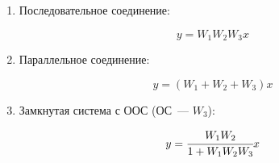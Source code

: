 \begin{enumerate}
    \item Последовательное соединение:
    \begin{figure}[h!]
        \begin{minipage}[h]{0.5\linewidth}
        \end{minipage}
        \begin{minipage}[h]{0.5\linewidth}
            \begin{equation}
                y = W_1 W_2 W_3 x
            \end{equation}
        \end{minipage}
    \end{figure}
    
    \item Параллельное соединение:
    \begin{figure}[h!]
        \begin{minipage}[h]{0.5\linewidth}
        \end{minipage}
        \begin{minipage}[h]{0.5\linewidth}
            \begin{equation}
                y = (W_1 + W_2 + W_3) x
            \end{equation}
    \end{minipage}
    \end{figure}
    
    \item Замкнутая система с ООС (ОС~--- $W_3$):
    \begin{figure}[h!]
        \begin{minipage}[h]{0.5\linewidth}
        \end{minipage}
        \begin{minipage}[h]{0.5\linewidth}
            \begin{equation}
                y = \cfrac{W_1 W_2}{1 + W_1 W_2 W_3} x
            \end{equation}
        \end{minipage}
    \end{figure}


\end{enumerate}
